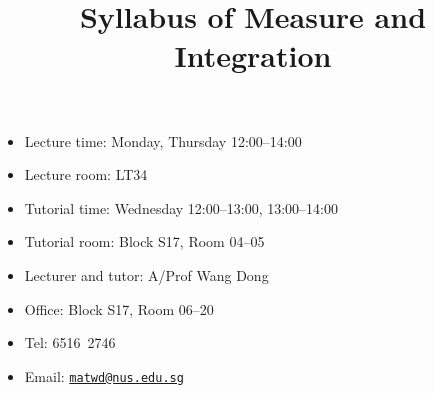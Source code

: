 \documentclass[a4paper]{article}
\title{Syllabus of Measure and Integration}
\date{}
\begin{document}
\maketitle

\begin{minipage}[t]{0.5\linewidth}
  \begin{itemize}[leftmargin=*]
  \item Lecture time: Monday, Thursday 12:00--14:00
  \item Lecture room: LT34
  \item Tutorial time: Wednesday 12:00--13:00, 13:00--14:00
  \item Tutorial room: Block S17, Room 04--05 
  \end{itemize}
\end{minipage}
\begin{minipage}[t]{0.4\linewidth}
  \begin{itemize}
  \item Lecturer and tutor: A/Prof Wang Dong
  \item Office: Block S17, Room 06--20
  \item Tel: 6516\ 2746
  \item Email: \href{mailto:matwd@nus.edu.sg}{\nolinkurl{matwd@nus.edu.sg}}
  \end{itemize}
\end{minipage}
\end{document}
